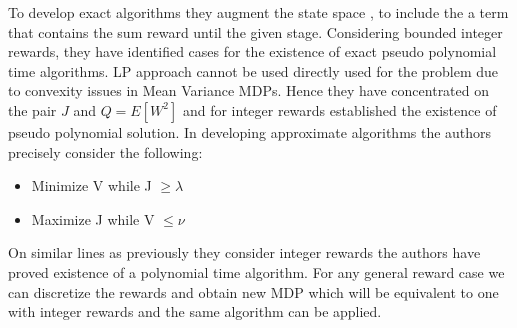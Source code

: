 \documentclass[11pt,a4paper,oneside]{report}
\begin{document}
To develop exact algorithms they augment the state space , to include the a term that contains the sum reward until the given stage. Considering bounded integer rewards, they have identified cases for the existence of exact pseudo polynomial time algorithms.  LP approach cannot be used directly used for the problem due to convexity issues in Mean Variance MDPs. Hence they have concentrated on the pair $J$ and $Q = E[W^2]$ and for integer rewards established the existence of pseudo polynomial solution.
In developing approximate algorithms the authors precisely consider the following:
\begin{itemize}
\item Minimize V while J $\geq \lambda$
\item Maximize J while V $\leq \nu$
\end{itemize}
On similar lines as previously they consider integer rewards the authors have proved existence of a polynomial time algorithm. For any general reward case we can discretize the rewards and obtain new MDP which will be equivalent to one with integer rewards and the same algorithm can be applied.\\
\end{document}
